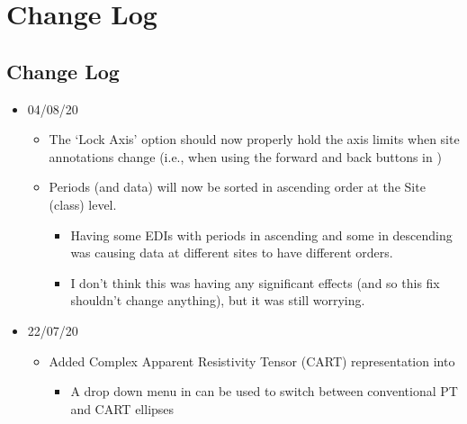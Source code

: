 \documentclass[letterpaper,10pt,english]{sphinxmanual}
\begin{document}
\section{Change Log}
\label{\detokenize{index:change-log}}

\subsection{Change Log}
\label{\detokenize{content/misc/changelog:change-log}}\label{\detokenize{content/misc/changelog::doc}}\begin{itemize}
\item {} 
04/08/20
\begin{itemize}
\item {} 
The {\hyperref[\detokenize{content/data_plot/map_viewer:map-viewer}]{}} ‘Lock Axis’ option should now properly hold the axis limits when site annotations change (i.e., when using the forward and back buttons in {\hyperref[\detokenize{content/data_plot/main_window:data-plot}]{}})

\item {} 
Periods (and data) will now be sorted in ascending order at the Site (class) level.
\begin{itemize}
\item {} 
Having some EDIs with periods in ascending and some in descending was causing data at different sites to have different orders.

\item {} 
I don’t think this was having any significant effects (and so this fix shouldn’t change anything), but it was still worrying.

\end{itemize}

\end{itemize}

\item {} 
22/07/20
\begin{itemize}
\item {} 
Added Complex Apparent Resistivity Tensor (CART) representation into {\hyperref[\detokenize{content/data_plot/map_viewer:map-viewer}]{}}
\begin{itemize}
\item {} 
A drop down menu in {\hyperref[\detokenize{content/data_plot/map_viewer:map-viewer}]{}} can be used to switch between conventional PT and CART ellipses


\end{itemize}
\end{itemize}
\end{itemize}
\end{document}
